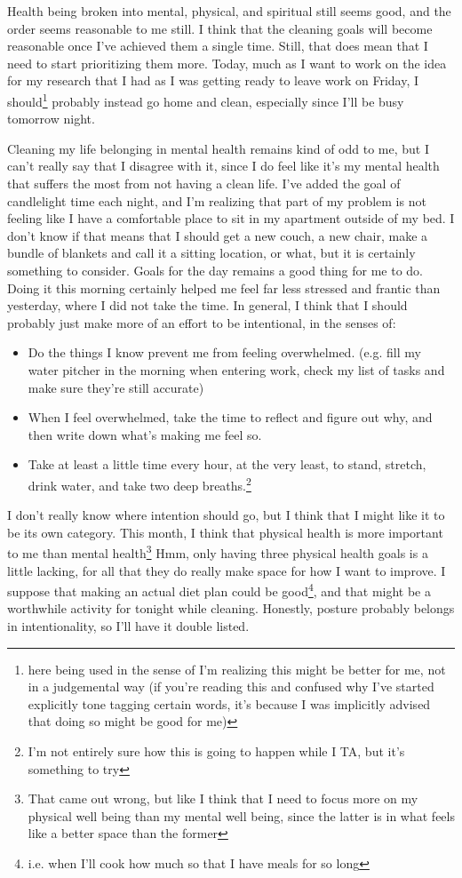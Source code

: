 \documentclass[12pt]{article}[titlepage]
\renewcommand{\,}{\textsuperscript{,}}
\begin{document}
Health being broken into mental, physical, and spiritual still seems good, and the order seems reasonable to me still.  
I think that the cleaning goals will become reasonable once I've achieved them a single time.  
Still, that does mean that I need to start prioritizing them more.  
Today, much as I want to work on the idea for my research that I had as I was getting ready to leave work on Friday, I should\footnote{here being used in the sense of I'm realizing this might be better for me, not in a judgemental way (if you're reading this and confused why I've started explicitly tone tagging certain words, it's because I was implicitly advised that doing so might be good for me)} probably instead go home and clean, especially since I'll be busy tomorrow night.

Cleaning my life belonging in mental health remains kind of odd to me, but I can't really say that I disagree with it, since I do feel like it's my mental health that suffers the most from not having a clean life.  
I've added the goal of candlelight time each night, and I'm realizing that part of my problem is not feeling like I have a comfortable place to sit in my apartment outside of my bed.  
I don't know if that means that I should get a new couch, a new chair, make a bundle of blankets and call it a sitting location, or what, but it is certainly something to consider.  
Goals for the day remains a good thing for me to do.  
Doing it this morning certainly helped me feel far less stressed and frantic than yesterday, where I did not take the time.  
In general, I think that I should probably just make more of an effort to be intentional, in the senses of:  
\begin{itemize}  
\item Do the things I know prevent me from feeling overwhelmed. (e.g. fill my water pitcher in the morning when entering work, check my list of tasks and make sure they're still accurate)  
\item When I feel overwhelmed, take the time to reflect and figure out why, and then write down what's making me feel so.  
\item Take at least a little time every hour, at the very least, to stand, stretch, drink water, and take two deep breaths.\footnote{I'm not entirely sure how this is going to happen while I TA, but it's something to try}  
\end{itemize}

I don't really know where intention should go, but I think that I might like it to be its own category.  
This month, I think that physical health is more important to me than mental health\footnote{That came out wrong, but like I think that I need to focus more on my physical well being than my mental well being, since the latter is in what feels like a better space than the former}  
Hmm, only having three physical health goals is a little lacking, for all that they do really make space for how I want to improve.  
I suppose that making an actual diet plan could be good\footnote{i.e. when I'll cook how much so that I have meals for so long}, and that might be a worthwhile activity for tonight while cleaning.  
Honestly, posture probably belongs in intentionality, so I'll have it double listed.
\end{document}
